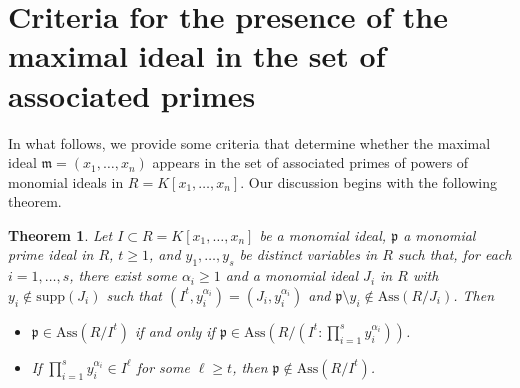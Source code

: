 \documentclass[11pt]{amsart}
\newtheorem{theorem}{Theorem}[section]
\begin{document}






\section{Criteria for the presence of the maximal  ideal in the set of  associated primes}\label{Section3}

In what follows, we provide some  criteria that determine whether the maximal ideal  $\mathfrak{m}=(x_1, \ldots, x_n)$  appears in the set of associated primes of powers of monomial ideals in $R=K[x_1, \ldots, x_n]$.  Our discussion begins with the following theorem.




\begin{theorem}    \label{Th.maximal-ideal.1}
Let $I\subset R=K[x_1, \ldots, x_n]$ be a monomial ideal, $\mathfrak{p}$ a monomial prime  ideal in $R$, $t\geq 1$, and   $y_1, \ldots, y_s$ be distinct variables in $R$ such that, for each $i=1, \ldots, s$, there exist  some  $\alpha_i \geq 1$ and a   monomial  ideal $J_i$ in $R$  with $y_i\notin \mathrm{supp}(J_i)$ such that
 $(I^t,y_i^{\alpha_i})=(J_i, y_i^{\alpha_i})$ and $\mathfrak{p}\setminus y_i \notin \mathrm{Ass}(R/J_i)$. 
 Then 
\begin{itemize}
\item[(i)] $\mathfrak{p}\in \mathrm{Ass}(R/I^t)$ if and only if $\mathfrak{p}\in \mathrm{Ass}(R/(I^t: \prod_{i=1}^sy_i^{\alpha_i}))$. 
\item[(ii)] If $\prod_{i=1}^{s}y_i^{\alpha_i} \in I^\ell$ for some $\ell \geq t$, then  $\mathfrak{p}\notin \mathrm{Ass}(R/I^t)$.
\end{itemize}
\end{theorem} 
\end{document}

